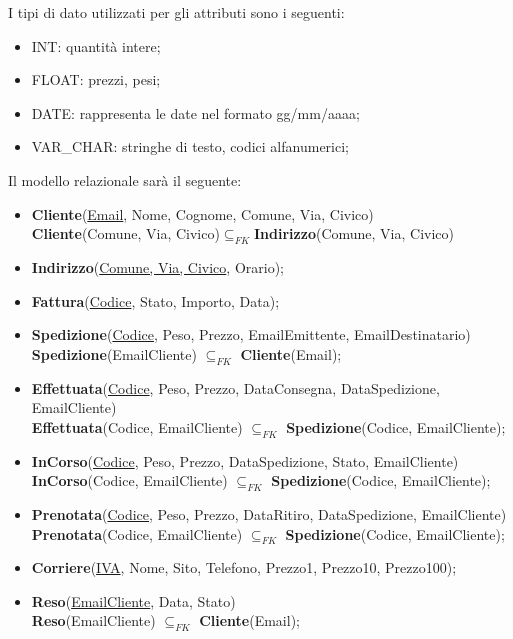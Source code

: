 \documentclass[a4paper,12pt]{article}
\begin{document}
I tipi di dato utilizzati per gli attributi sono i seguenti:
\begin{itemize}
  \item INT: quantità intere;
  \item FLOAT: prezzi, pesi;
  \item DATE: rappresenta le date nel formato gg/mm/aaaa;
  \item VAR\_CHAR: stringhe di testo, codici alfanumerici;
\end{itemize}

Il modello relazionale sarà il seguente:
\begin{itemize}
  \item \textbf{Cliente}(\underline{Email}, Nome, Cognome, Comune, Via, Civico)\\ \textbf{Cliente}(Comune, Via, Civico)$\subseteq _{FK}$\textbf{Indirizzo}(Comune, Via, Civico)
  \item \textbf{Indirizzo}(\underline{Comune, Via, Civico}, Orario); 
  \item \textbf{Fattura}(\underline{Codice}, Stato, Importo, Data);
  \item \textbf{Spedizione}(\underline{Codice}, Peso, Prezzo, EmailEmittente, EmailDestinatario) \\ \textbf{Spedizione}(EmailCliente) $\subseteq _{FK}$ \textbf{Cliente}(Email);
  \item \textbf{Effettuata}(\underline{Codice}, Peso, Prezzo, DataConsegna, DataSpedizione, EmailCliente) \\ \textbf{Effettuata}(Codice, EmailCliente) $\subseteq _{FK}$ \textbf{Spedizione}(Codice, EmailCliente);
  \item \textbf{InCorso}(\underline{Codice}, Peso, Prezzo, DataSpedizione, Stato, EmailCliente) \\ \textbf{InCorso}(Codice, EmailCliente) $\subseteq _{FK}$ \textbf{Spedizione}(Codice, EmailCliente);
  \item \textbf{Prenotata}(\underline{Codice}, Peso, Prezzo, DataRitiro, DataSpedizione, EmailCliente) \\ \textbf{Prenotata}(Codice, EmailCliente) $\subseteq _{FK}$ \textbf{Spedizione}(Codice, EmailCliente);
  \item \textbf{Corriere}(\underline{IVA}, Nome, Sito, Telefono, Prezzo1, Prezzo10, Prezzo100);
  \item \textbf{Reso}(\underline{EmailCliente}, Data, Stato)\\ \textbf{Reso}(EmailCliente) $\subseteq _{FK}$ \textbf{Cliente}(Email);

\end{itemize}
\end{document}
